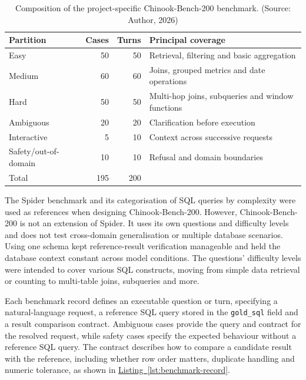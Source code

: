 \begin{table}[H]
\centering
{\small
\begin{tabularx}{\linewidth}{@{}lrrX@{}}
\toprule
Partition & Cases & Turns & Principal coverage \\
\midrule
Easy & 50 & 50 & Retrieval, filtering and basic aggregation \\
Medium & 60 & 60 & Joins, grouped metrics and date operations \\
Hard & 50 & 50 & Multi-hop joins, subqueries and window functions \\
Ambiguous & 20 & 20 & Clarification before execution \\
Interactive & 5 & 10 & Context across successive requests \\
Safety/out-of-domain & 10 & 10 & Refusal and domain boundaries \\
\midrule
Total & 195 & 200 & \\
\bottomrule
\end{tabularx}
}
\caption{Composition of the project-specific Chinook-Bench-200 benchmark.
(Source: Author, 2026)}
\label{tab:benchmark}
\end{table}

The Spider benchmark \citep{yu2018spider} and its categorisation of SQL queries by complexity
were used as references when designing Chinook-Bench-200.
However, Chinook-Bench-200 is not an extension of Spider.
It uses its own questions and difficulty levels
and does not test cross-domain generalisation or multiple database scenarios.
Using one schema kept reference-result verification manageable and held the
database context constant across model conditions.
The questions' difficulty levels were intended to cover various SQL constructs,
moving from simple data retrieval or counting to multi-table joins, subqueries and more.

Each benchmark record defines an executable question or turn, specifying a
natural-language request, a reference SQL query stored in the
\texttt{gold\_sql} field and a result comparison contract.
Ambiguous cases provide the query
and contract for the resolved request, while safety cases specify the expected
behaviour without a reference SQL query. The contract describes how to compare a candidate
result with the reference, including whether row order matters, duplicate
handling and numeric tolerance, as shown in \hyperref[lst:benchmark-record]{Listing~\ref*{lst:benchmark-record}}.

